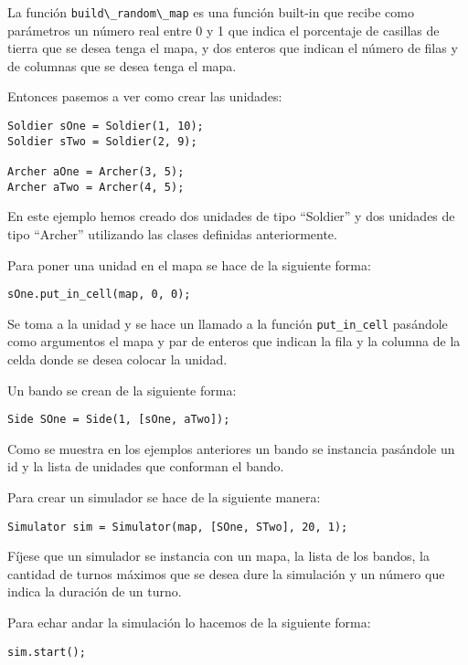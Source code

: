 La funci\'on \verb|build\_random\_map| es una funci\'on built-in que recibe como par\'ametros un n\'umero real entre 0 y 1 que indica el porcentaje de casillas de tierra que se desea tenga el mapa, y dos enteros que indican el n\'umero de filas y de columnas que se desea tenga el mapa.

Entonces pasemos a ver como crear las unidades:

\begin{verbatim}
Soldier sOne = Soldier(1, 10);
Soldier sTwo = Soldier(2, 9);
	
Archer aOne = Archer(3, 5);
Archer aTwo = Archer(4, 5);	
\end{verbatim}  

En este ejemplo hemos creado dos unidades de tipo ``Soldier'' y dos unidades de tipo ``Archer'' utilizando las clases definidas anteriormente.

Para poner una unidad en el mapa se hace de la siguiente forma:

\begin{verbatim}
sOne.put_in_cell(map, 0, 0);
\end{verbatim}

Se toma a la unidad y se hace un llamado a la funci\'on \verb|put_in_cell| pas\'andole como argumentos el mapa y par de enteros que indican la fila y la columna de la celda donde se desea colocar la unidad.

Un bando se crean de la siguiente forma:
  
\begin{verbatim}
Side SOne = Side(1, [sOne, aTwo]);
\end{verbatim}

Como se muestra en los ejemplos anteriores un bando se instancia pas\'andole un id y la lista de unidades que conforman el bando.

Para crear un simulador se hace de la siguiente manera:

\begin{verbatim}
Simulator sim = Simulator(map, [SOne, STwo], 20, 1);
\end{verbatim}

F\'ijese que un simulador se instancia con un mapa, la lista de los bandos, la cantidad de turnos m\'aximos que se desea dure la simulaci\'on y un n\'umero que indica la duraci\'on de un turno.

Para echar andar la simulaci\'on lo hacemos de la siguiente forma: 

\begin{verbatim}
sim.start();
\end{verbatim}


